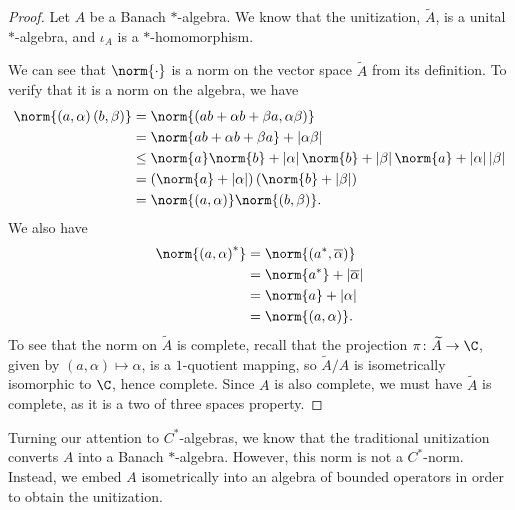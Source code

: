 \documentclass[10pt]{mypackage}
\begin{document}
\begin{proof}
  Let $A$ be a Banach $\ast$-algebra. We know that the unitization, $\widetilde{A}$, is a unital $\ast$-algebra, and $\iota_A$ is a $\ast$-homomorphism.\newline

  We can see that $\norm{\cdot}$ is a norm on the vector space $\widetilde{A}$ from its definition. To verify that it is a norm on the algebra, we have
  \begin{align*}
    \norm{\left(a,\alpha\right)\left(b,\beta\right)} &= \norm{\left(ab + \alpha b + \beta a,\alpha\beta\right)}\\
                                                     &= \norm{ab + \alpha b + \beta a} + \left\vert \alpha \beta \right\vert\\
                                                     &\leq \norm{a}\norm{b} + \left\vert \alpha \right\vert\norm{b} + \left\vert \beta \right\vert\norm{a} + \left\vert \alpha \right\vert\left\vert \beta \right\vert\\
                                                     &= \left(\norm{a} + \left\vert \alpha \right\vert\right) \left(\norm{b} + \left\vert \beta \right\vert\right)\\
                                                     &= \norm{\left(a,\alpha\right)}\norm{\left(b,\beta\right)}.
  \end{align*}
  We also have
  \begin{align*}
    \norm{\left(a,\alpha\right)^{\ast}} &= \norm{\left(a^{\ast},\overline{\alpha}\right)}\\
                                        &= \norm{a^{\ast}} + \left\vert \overline{\alpha} \right\vert\\
                                        &= \norm{a} + \left\vert \alpha \right\vert\\
                                        &= \norm{\left(a,\alpha\right)}.
  \end{align*}
  To see that the norm on $\widetilde{A}$ is complete, recall that the projection $\pi\colon \widetilde{A}\rightarrow \C$, given by $\left(a,\alpha\right)\mapsto \alpha$, is a $1$-quotient mapping, so $\widetilde{A}/A$ is isometrically isomorphic to $\C$, hence complete. Since $A$ is also complete, we must have $\widetilde{A}$ is complete, as it is a two of three spaces property.
\end{proof}
Turning our attention to $C^{\ast}$-algebras, we know that the traditional unitization converts $A$ into a Banach $\ast$-algebra. However, this norm is not a $C^{\ast}$-norm. Instead, we embed $A$ isometrically into an algebra of bounded operators in order to obtain the unitization.\newline
\end{document}
